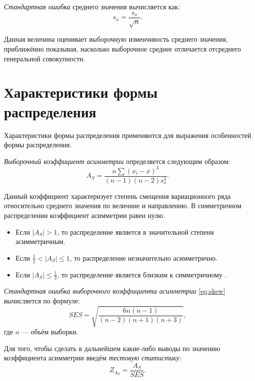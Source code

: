 \textit{Стандартная ошибка} среднего значения вычисляется как:
\begin{equation*}
	s_{\overline{x}} = \frac{s_x}{\sqrt{n}}.
\end{equation*}

Данная величина оценивает выборочную изменчивость среднего значения, приближённо показывая, насколько выборочное среднее отличается отсреднего генеральной совокупности.


\section*{Характеристики формы распределения} %
\label{sec:chars_distr}

Характеристики формы распределения применяются для выражения особенностей формы распределения.

\textit{Выборочный коэффициент асимметрии} определяется следующим образом:
\begin{equation}
\label{eq:skew}
	A_S = \frac{n\sum{(x_i - \overline{x})^3}}{(n - 1)(n - 2)s_x^3}.
\end{equation}

Данный коэффициент характеризует степень смещения вариационного ряда относительно среднего значения по величине и направлению. В симметричном распределении коэффициент асимметрии равен нулю. 
\begin{itemize}
	\item Если $\vert A_S \vert > 1$, то распределение является в значительной степени асимметричным. 
	\item Если $\frac{1}{2} < \vert A_S \vert \le 1$, то распределение незначительно асимметрично. 
	\item Если $\vert A_S \vert \le \frac{1}{2}$, то распределение является близким к симметричному \cite{Bulmer1979Principles}.
\end{itemize}

\textit{Стандартная ошибка выборочного коэффициента асимметрии} \eqref{eq:skew} вычисляется по формуле:
\begin{equation*}
	SES= \sqrt{\frac{6n(n - 1)}{(n - 2)(n + 1)(n + 3)}},
\end{equation*}
где $n$ --- объём выборки.

Для того, чтобы сделать в дальнейшем какие-либо выводы по значению коэффициента асимметрии введём \textit{тестовую статистику}: 
\begin{equation*}
	Z_{A_S}=\frac{A_S}{SES}.
\end{equation*}

